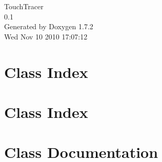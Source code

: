 \documentclass[a4paper]{book}
\begin{document}
\hypersetup{pageanchor=false}
\begin{titlepage}
\vspace*{7cm}
\begin{center}
{\Large TouchTracer \\[1ex]\large 0.1 }\\
\vspace*{1cm}
{\large Generated by Doxygen 1.7.2}\\
\vspace*{0.5cm}
{\small Wed Nov 10 2010 17:07:12}\\
\end{center}
\end{titlepage}
\clearemptydoublepage
{}
\tableofcontents
\clearemptydoublepage
{}
\hypersetup{pageanchor=true}
\chapter{Class Index}

\chapter{Class Index}

\chapter{Class Documentation}


















\printindex
\end{document}
